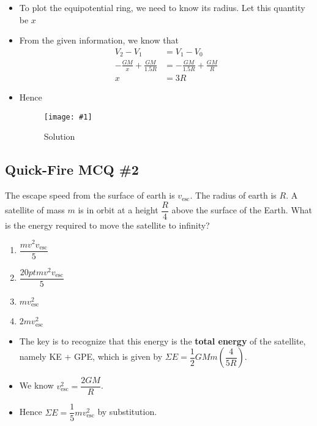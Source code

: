 \documentclass[a4paper,12pt]{article}
\newcommand{\img}[4]{\begin{center}
  \begin{figure}[H]
    \centering
    \texttt{[image: \#1]}
    \caption{#3}
    \label{fig:#4}
  \end{figure}
\end{center}}
\begin{document}
\begin{enumerate}[label=(\alph*)]
\begin{enumerate}[label=(\roman*)]
\begin{itemize}
                  \item To plot the equipotential ring, we need to know its radius. Let this quantity be $x$
                  \item From the given information, we know that \begin{align*}
                          V_2 - V_1                       & = V_1 - V_0                       \\
                          -\frac{GM}{x} + \frac{GM}{1.5R} & = -\frac{GM}{1.5R} + \frac{GM}{R} \\
                          x                               & = 3R
                        \end{align*}
                  \item Hence
                        \img{ex/6.png}{0.4}{Solution}{ex6}
                \end{itemize}
        \end{enumerate}
\end{enumerate}

\pagebreak

\subsection{Quick-Fire MCQ \#2}

The escape speed from the surface of earth is $v_\text{esc}$. The radius of earth is $R$. A satellite of mass $m$ is in orbit at a height $\dfrac{R}{4}$ above the surface of the Earth. What is the energy required to move the satellite to infinity?
\begin{enumerate}[label=\Alph*.]
  \item $\dfrac{mv^2v_\text{esc}}{5}$
  \item $\dfrac{20ptmv^2v_\text{esc}}{5}$
  \item $mv_\text{esc}^2$
  \item $2mv_\text{esc}^2$
\end{enumerate}

\begin{itemize}
  \item The key is to recognize that this energy is the \textbf{total energy} of the satellite, namely KE + GPE, which is given by $\Sigma E = \dfrac{1}{2}GMm\left(\dfrac{4}{5R}\right)$.
  \item We know $v_\text{esc}^2 = {\dfrac{2GM}{R}}$.
  \item Hence $\Sigma E = \dfrac{1}{5}mv_\text{esc}^2$ by substitution.
\end{itemize}
\end{document}
